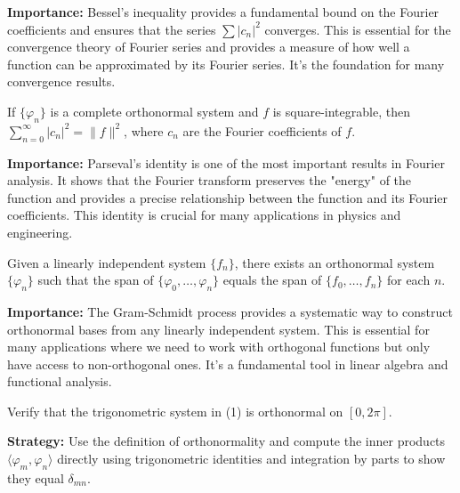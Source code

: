 \noindent\textbf{Importance:} Bessel's inequality provides a fundamental bound on the Fourier coefficients and ensures that the series $\sum |c_n|^2$ converges. This is essential for the convergence theory of Fourier series and provides a measure of how well a function can be approximated by its Fourier series. It's the foundation for many convergence results.



\begin{theorem}
If $\{\varphi_n\}$ is a complete orthonormal system and $f$ is square-integrable, then $\sum_{n=0}^{\infty} |c_n|^2 = \|f\|^2$, where $c_n$ are the Fourier coefficients of $f$.
\end{theorem}

\noindent\textbf{Importance:} Parseval's identity is one of the most important results in Fourier analysis. It shows that the Fourier transform preserves the "energy" of the function and provides a precise relationship between the function and its Fourier coefficients. This identity is crucial for many applications in physics and engineering.



\begin{theorem}
Given a linearly independent system $\{f_n\}$, there exists an orthonormal system $\{\varphi_n\}$ such that the span of $\{\varphi_0, \ldots, \varphi_n\}$ equals the span of $\{f_0, \ldots, f_n\}$ for each $n$.
\end{theorem}

\noindent\textbf{Importance:} The Gram-Schmidt process provides a systematic way to construct orthonormal bases from any linearly independent system. This is essential for many applications where we need to work with orthogonal functions but only have access to non-orthogonal ones. It's a fundamental tool in linear algebra and functional analysis.



\begin{problembox}
\begin{problemstatement}
Verify that the trigonometric system in (1) is orthonormal on $[0, 2\pi]$.
\end{problemstatement}
\end{problembox}

\noindent\textbf{Strategy:} Use the definition of orthonormality and compute the inner products $\langle \varphi_m, \varphi_n \rangle$ directly using trigonometric identities and integration by parts to show they equal $\delta_{mn}$.

